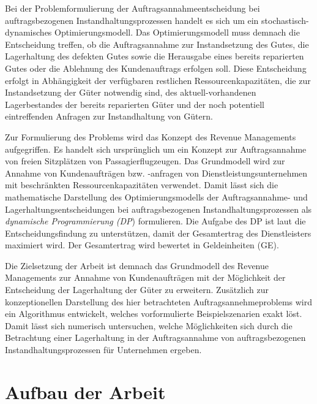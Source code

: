 Bei der Problemformulierung der Auftragsannahmeentscheidung bei auftragsbezogenen Instandhaltungsprozessen handelt es sich um ein stochastisch-dynamisches Optimierungsmodell. Das Optimierungsmodell muss demnach die Entscheidung treffen, ob die Auftragsannahme zur Instandsetzung des Gutes, die Lagerhaltung des defekten Gutes sowie die Herausgabe eines bereits reparierten Gutes oder die Ablehnung des Kundenauftrags erfolgen soll. Diese Entscheidung erfolgt in Abhängigkeit der verfügbaren restlichen Ressourcenkapazitäten, die zur Instandsetzung der Güter notwendig sind, des aktuell-vorhandenen Lagerbestandes der bereits reparierten Güter und der noch potentiell eintreffenden Anfragen zur Instandhaltung von Gütern.

Zur Formulierung des Problems wird das Konzept des Revenue Managements aufgegriffen. Es handelt sich ursprünglich um ein Konzept zur Auftragsannahme von freien Sitzplätzen von Passagierflugzeugen. Das Grundmodell wird zur Annahme von Kundenaufträgen bzw. -anfragen von Dienstleistungsunternehmen mit beschränkten Ressourcenkapazitäten verwendet. %
Damit lässt sich die mathematische Darstellung des Optimierungsmodells der Auftragsannahme- und Lagerhaltungsentscheidungen bei auftragsbezogenen Instandhaltungsprozessen als \textit{dynamische Programmierung (DP}) formulieren.
Die Aufgabe des DP ist laut \cite{talluri2004theory} die Entscheidungsfindung zu unterstützen, damit der Gesamtertrag des Dienstleisters maximiert wird. Der Gesamtertrag wird bewertet in Geldeinheiten (GE). 


Die Zielsetzung der Arbeit ist demnach das Grundmodell des Revenue Managements zur Annahme von Kundenaufträgen mit der Möglichkeit der Entscheidung der Lagerhaltung der Güter zu erweitern. Zusätzlich zur konzeptionellen Darstellung des hier betrachteten Auftragsannehmeproblems wird ein Algorithmus entwickelt, welches vorformulierte Beispielszenarien exakt löst.  Damit lässt sich numerisch untersuchen, welche Möglichkeiten sich durch die Betrachtung einer Lagerhaltung in der Auftragsannahme von auftragsbezogenen Instandhaltungsprozessen für Unternehmen ergeben.

\section{Aufbau der Arbeit}


